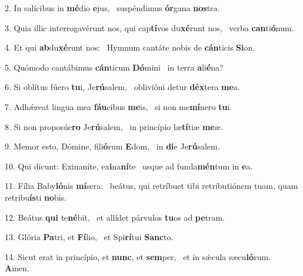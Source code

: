 2. In salícibus in \textbf{mé}dio \textbf{e}jus, \ast\  suspéndimus \textbf{ór}gana \textbf{nos}tra.\

3. Quia illic interrogavérunt nos, qui cap\textbf{tí}vos du\textbf{xé}runt nos, \ast\  verba \textbf{can}ti\textbf{ó}num.\

4. Et qui \textbf{ab}du\textbf{xé}runt nos: \ast\  Hymnum cantáte nobis de \textbf{cán}ticis \textbf{Si}on.\

5. Quómodo cantábimus \textbf{cán}ticum \textbf{Dó}mini \ast\  in terra \textbf{a}li\textbf{é}na?\

6. Si oblítus fúero \textbf{tu}i, Je\textbf{rú}salem, \ast\  oblivióni detur \textbf{déx}tera \textbf{me}a.\

7. Adhǽreat lingua mea \textbf{fáu}cibus \textbf{me}is, \ast\  si non me\textbf{mí}nero \textbf{tu}i.\

8. Si non proposúe\textbf{ro} Je\textbf{rú}salem, \ast\  in princípio læ\textbf{tí}tiæ \textbf{me}æ.\

9. Memor esto, Dómine, fili\textbf{ó}rum \textbf{E}dom, \ast\  in \textbf{di}e Je\textbf{rú}salem.\

10. Qui dicunt: Exinaníte, ex\textbf{i}na\textbf{ní}te \ast\  usque ad funda\textbf{mén}tum in \textbf{e}a.\

11. Fília Baby\textbf{ló}nis \textbf{mí}sera: \ast\  beátus, qui retríbuet tibi retributiónem tuam, quam retribu\textbf{ís}ti \textbf{no}bis.\

12. Beátus \textbf{qui} te\textbf{né}bit, \ast\  et allídet párvulos \textbf{tu}os ad \textbf{pe}tram.\

13. Glória \textbf{Pa}tri, et \textbf{Fí}lio, \ast\  et Spi\textbf{rí}tui \textbf{Sanc}to.\

14. Sicut erat in princípio, et \textbf{nunc}, et \textbf{sem}per, \ast\  et in sǽcula sæcu\textbf{ló}rum. \textbf{A}men.\

